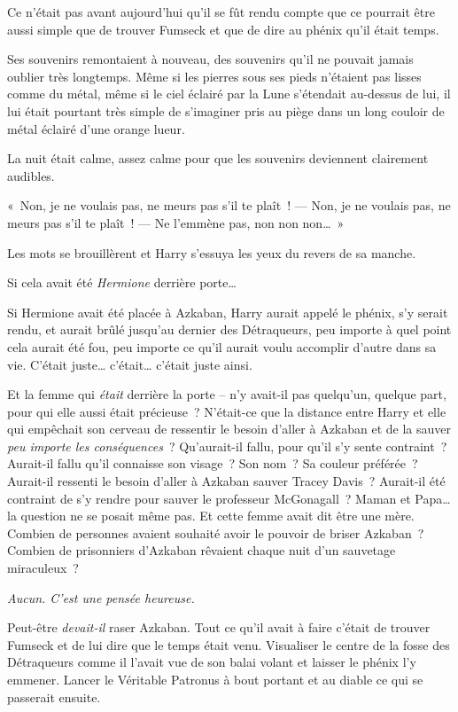 Ce n'était pas avant aujourd'hui qu'il se fût rendu compte que ce pourrait être aussi simple que de trouver Fumseck et que de dire au phénix qu'il était temps.

Ses souvenirs remontaient à nouveau, des souvenirs qu'il ne pouvait jamais oublier très longtemps.
Même si les pierres sous ses pieds n'étaient pas lisses comme du métal, même si le ciel éclairé par la Lune s'étendait au-dessus de lui, il lui était pourtant très simple de s'imaginer pris au piège dans un long couloir de métal éclairé d'une orange lueur.

La nuit était calme, assez calme pour que les souvenirs deviennent clairement audibles.

«~Non, je ne voulais pas, ne meurs pas s'il te plaît~!
---  Non, je ne voulais pas, ne meurs pas s'il te plaît~!
---  Ne l'emmène pas, non non non…~»

Les mots se brouillèrent et Harry s'essuya les yeux du revers de sa manche.

Si cela avait été \emph{Hermione} derrière porte…

Si Hermione avait été placée à Azkaban, Harry aurait appelé le phénix, s'y serait rendu, et aurait brûlé jusqu'au dernier des Détraqueurs, peu importe à quel point cela aurait été fou, peu importe ce qu'il aurait voulu accomplir d'autre dans sa vie.
C'était juste… c'était… c'était juste ainsi.

Et la femme qui \emph{était} derrière la porte -- n'y avait-il pas quelqu'un, quelque part, pour qui elle aussi était précieuse~?
N'était-ce que la distance entre Harry et elle qui empêchait son cerveau de ressentir le besoin d'aller à Azkaban et de la sauver \emph{peu importe les conséquences}~?
Qu'aurait-il fallu, pour qu'il s'y sente contraint~?
Aurait-il fallu qu'il connaisse son visage~?
Son nom~?
Sa couleur préférée~?
Aurait-il ressenti le besoin d'aller à Azkaban sauver Tracey Davis~?
Aurait-il été contraint de s'y rendre pour sauver le professeur McGonagall~?
Maman et Papa… la question ne se posait même pas.
Et cette femme avait dit être une mère.
Combien de personnes avaient souhaité avoir le pouvoir de briser Azkaban~?
Combien de prisonniers d'Azkaban rêvaient chaque nuit d'un sauvetage miraculeux~?

\emph{Aucun.
C'est une pensée heureuse.}

Peut-être \emph{devait-il} raser Azkaban.
Tout ce qu'il avait à faire c'était de trouver Fumseck et de lui dire que le temps était venu.
Visualiser le centre de la fosse des Détraqueurs comme il l'avait vue de son balai volant et laisser le phénix l'y emmener.
Lancer le Véritable Patronus à bout portant et au diable ce qui se passerait ensuite.

